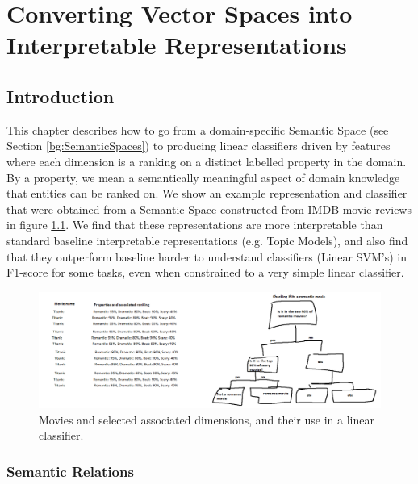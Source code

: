 \chapter{Converting Vector Spaces into Interpretable Representations}\label{Chapter3}


\section{Introduction}\label{chapter3:Introduction}

This chapter describes how to go from a domain-specific Semantic Space (see Section \ref{bg:SemanticSpaces}) to producing linear classifiers driven by features where each dimension is a ranking on a distinct labelled property in the domain. By a property, we mean a semantically meaningful aspect of domain knowledge that entities can be ranked on. We show an example representation and classifier that were obtained from a Semantic Space constructed from IMDB movie reviews in figure \ref{ch3:TreeAndRep}.  We find that these representations are more interpretable than standard baseline interpretable representations (e.g. Topic Models), and also find that they outperform baseline harder to understand classifiers (Linear SVM's) in F1-score for some tasks, even when constrained to a very simple linear classifier. 

\begin{figure}[t]
	\includegraphics[width=\textwidth]{images/tree and rep.png}
	\centering
	\caption{Movies and selected associated dimensions, and their use in a linear classifier.}\label{ch3:TreeAndRep}
\end{figure}

\subsection{Semantic Relations}


